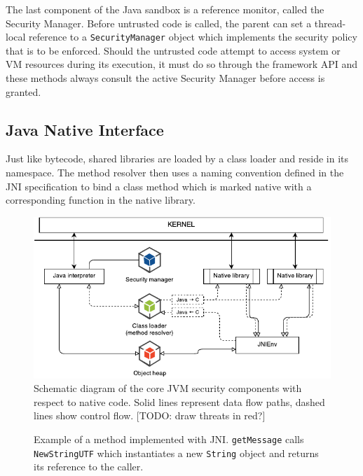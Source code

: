 \documentclass[a4paper,12pt,twoside,openright]{report}
\newcommand{\keyword}[1]{\textsf{#1}}
\newcommand{\class}[1]{\texttt{#1}}
\begin{document}
The last component of the Java sandbox is a reference monitor, called the Security Manager. Before untrusted code is called, the parent can set a thread-local reference to a \class{SecurityManager} object which implements the security policy that is to be enforced. Should the untrusted code attempt to access system or VM resources during its execution, it must do so through the framework API and these methods always consult the active Security Manager before access is granted.

\subsection{Java Native Interface}

Just like bytecode, shared libraries are loaded by a class loader and reside in its namespace. The method resolver then uses a naming convention defined in the JNI specification to bind a class method which is marked \keyword{native} with a corresponding function in the native library.

\begin{figure}
	\includegraphics[width=\textwidth]{dia_jni_orig.pdf}
	\caption{Schematic diagram of the core JVM security components with respect to native code. Solid lines represent data flow paths, dashed lines show control flow. [TODO: draw threats in red?]}
	\label{fig:OverviewJNI}
\end{figure}

\begin{figure}[t]
	
	
	\caption{Example of a method implemented with JNI. \texttt{getMessage} calls \texttt{NewStringUTF} which instantiates a new \texttt{String} object and returns its reference to the caller.}
	\label{listing:HelloJNI}
\end{figure}
\end{document}
